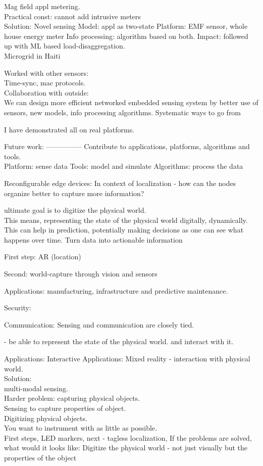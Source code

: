 \documentclass[10pt]{article}
\begin{document}
Mag field appl metering.\\
Practical const: cannot add intrusive meters\\
Solution: Novel sensing
Model: appl as two-state
Platform: EMF sensor, whole house energy meter
Info processing: algorithm based on both.
Impact: followed up with ML based load-disaggregation.\\
Microgrid in Haiti

Worked with other sensors:\\
Time-sync, mac protocols.\\
Collaboration with outside:\\

We can design more efficient networked embedded sensing system by better use of sensors, new models, info processing algorithms. Systematic ways to go from 

I have demonstrated all on real platforms.


Future work: ---------------
Contribute to applications, platforms, algorithms and tools. \\

Platform: sense data
Tools: model and simulate
Algorithms: process the data

Reconfigurable edge devices:
In context of localization - how can the nodes organize better to capture more information?


ultimate goal is to digitize the physical world.\\
This means, representing the state of the physical world digitally, dynamically. This can help in prediction, potentially making decisions as one can see what happens over time.
Turn data into actionable information


First step: AR (location)

Second: world-capture through vision and sensors

Applications: manufacturing, infrastructure and predictive maintenance.

Security:

Communication: Sensing and communication are closely tied.



 - be able to represent the state of the physical world. and interact with it.

Applications:
Interactive Applications: Mixed reality - interaction with physical world.\\
Solution:\\
multi-modal sensing.\\
Harder problem: capturing physical objects. \\
Sensing to capture properties of object.\\
Digitizing physical objects.\\
You want to instrument with as little as possible.\\
First steps, LED markers, next - tagless localization, 
If the problems are solved, what would it looks like: Digitize the physical world - not just visually but the properties of the object
\end{document}

